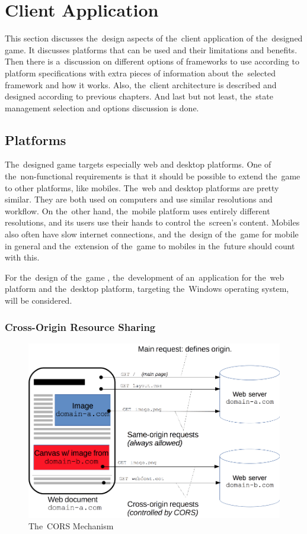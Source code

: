 \section{Client Application}
\label{design:client-application}

This section discusses the~design aspects of the~client application of the~designed game.
It discusses platforms that can be used and their limitations and benefits.
Then there is a~discussion on different options of frameworks to use according to platform specifications with extra pieces of information about the~selected framework and how it works.
Also, the~client architecture is described and designed according to previous chapters. 
And last but not least, the~state management selection and options discussion is done.

\subsection{Platforms}

The~designed game targets especially web and desktop platforms.
One of the~non-functional requirements is that it should be possible to extend the~game to other platforms, like mobiles.
The~web and desktop platforms are pretty similar.
They are both used on computers and use similar resolutions and workflow.
On the~other hand, the~mobile platform uses entirely different resolutions, and its users use their hands to control the~screen's content.
Mobiles also often have slow internet connections, and the~design of the~game for mobile in general and the~extension of the~game to mobiles in the~future should count with this.

For the~design of the~game \myAppName{}, the~development of an~application for the~web platform and the~desktop platform, targeting the~Windows operating system, will be considered.

\subsubsection{Cross-Origin Resource Sharing}

\begin{figure}
    \centering
    \includegraphics[width=1\linewidth]{assets/design/cors.png}
    \caption{The~CORS Mechanism~\cite{a2022_crossorigin}}
    \label{fig:design:cors-mechanism}
\end{figure}

